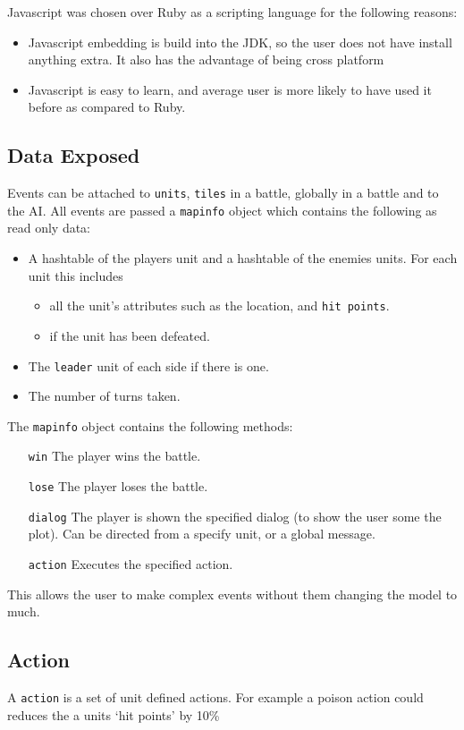\noindent Javascript was chosen over Ruby as a scripting language for the following reasons:
\begin{itemize}
	\item Javascript embedding is build into the JDK, so the user does not have install anything extra. It also has the advantage of being cross platform  
	\item Javascript is easy to learn, and average user is more likely to have used it before as compared to Ruby.
\end{itemize}

\subsection{Data Exposed}
	Events can be attached to \texttt{units}, \texttt{tiles} in a battle, globally in a battle and to the AI.
All events are passed a \texttt{mapinfo} object which contains the following as read only data:
\begin{itemize}
	\item A hashtable of the players unit and a hashtable of the enemies units. For each unit this includes 
		\begin{itemize}
			\item all the unit's attributes such as the location, and \texttt{hit points}. 
			\item if the unit has been defeated. 
		\end{itemize}
	\item The \texttt{leader} unit of each side if there is one.
	\item The number of turns taken.
\end{itemize}
The \texttt{mapinfo}  object contains the following methods:
\begin{itemize}
	\item[\texttt{win}]     The player wins the battle.
	\item[\texttt{lose}]    The player loses the battle.
	\item[\texttt{dialog}]  The player is shown the specified dialog (to show the user some the plot). Can be directed from a specify unit, or a global message.
	\item[\texttt{action}]   Executes the specified action.
\end{itemize}

This allows the user to make complex events without them changing the model to much.

\subsection{Action}
A \texttt{action} is a set of unit defined actions. For example a poison action could reduces the a units `hit points' by 10\% 

